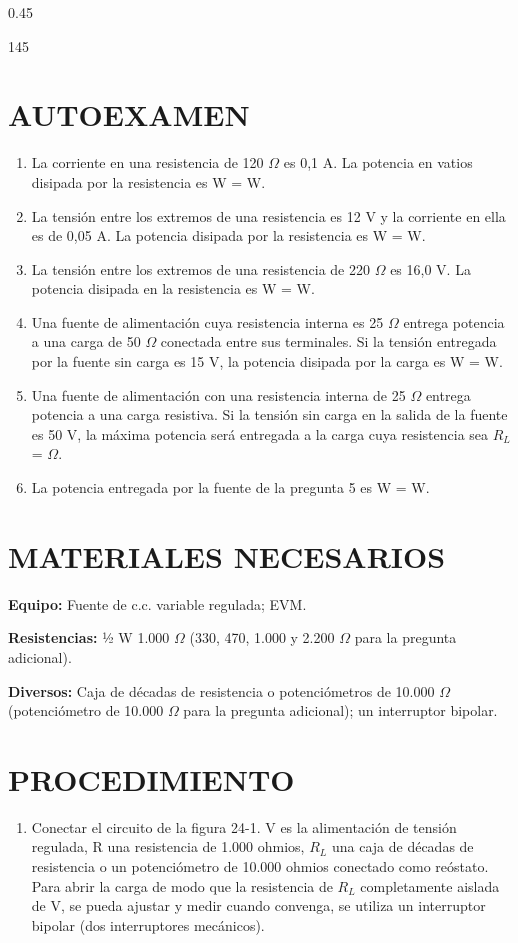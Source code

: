 \documentclass{article}
\begin{document}
\begin{parbox}[t]{0.45\textwidth}{
    \hfill 145
    
    \section*{AUTOEXAMEN}
    \begin{enumerate}
        \item La corriente en una resistencia de 120 $\Omega$ es 0,1 A. La potencia en vatios disipada por la resistencia es W = \dotfill W.
        \item La tensión entre los extremos de una resistencia es 12 V y la corriente en ella es de 0,05 A. La potencia disipada por la resistencia es W = \dotfill W.
        \item La tensión entre los extremos de una resistencia de 220 $\Omega$ es 16,0 V. La potencia disipada en la resistencia es W = \dotfill W.
        \item Una fuente de alimentación cuya resistencia interna es 25 $\Omega$ entrega potencia a una carga de 50 $\Omega$ conectada entre sus terminales. Si la tensión entregada por la fuente sin carga es 15 V, la potencia disipada por la carga es W = \dotfill W.
        \item Una fuente de alimentación con una resistencia interna de 25 $\Omega$ entrega potencia a una carga resistiva. Si la tensión sin carga en la salida de la fuente es 50 V, la máxima potencia será entregada a la carga cuya resistencia sea $R_L$ = \dotfill $\Omega$.
        \item La potencia entregada por la fuente de la pregunta 5 es W = \dotfill W.
    \end{enumerate}

    \section*{MATERIALES NECESARIOS}
    \textbf{Equipo:} Fuente de c.c. variable regulada; EVM.
    
    \textbf{Resistencias:} ½ W 1.000 $\Omega$ (330, 470, 1.000 y 2.200 $\Omega$ para la pregunta adicional).
    
    \textbf{Diversos:} Caja de décadas de resistencia o potenciómetros de 10.000 $\Omega$ (potenciómetro de 10.000 $\Omega$ para la pregunta adicional); un interruptor bipolar.

    \section*{PROCEDIMIENTO}
    \begin{enumerate}
        \item Conectar el circuito de la figura 24-1. V es la alimentación de tensión regulada, R una resistencia de 1.000 ohmios, $R_L$ una caja de décadas de resistencia o un potenciómetro de 10.000 ohmios conectado como reóstato. Para abrir la carga de modo que la resistencia de $R_L$ completamente aislada de V, se pueda ajustar y medir cuando convenga, se utiliza un interruptor bipolar (dos interruptores mecánicos).
    \end{enumerate}

}\end{parbox}
\end{document}
